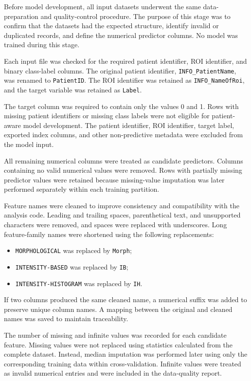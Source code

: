 \documentclass[12pt,twocolumn]{article}
\begin{document}
Before model development, all input datasets underwent the same
data-preparation and quality-control procedure. The purpose of this
stage was to confirm that the datasets had the expected structure,
identify invalid or duplicated records, and define the numerical
predictor columns. No model was trained during this stage.

Each input file was checked for the required patient identifier, ROI
identifier, and binary class-label columns. The original patient
identifier, \texttt{INFO\_PatientName}, was renamed to
\texttt{PatientID}. The ROI identifier was retained as
\texttt{INFO\_NameOfRoi}, and the target variable was retained as
\texttt{Label}.

The target column was required to contain only the values 0 and 1.
Rows with missing patient identifiers or missing class labels were not
eligible for patient-aware model development. The patient identifier,
ROI identifier, target label, exported index columns, and other
non-predictive metadata were excluded from the model input.

All remaining numerical columns were treated as candidate predictors.
Columns containing no valid numerical values were removed. Rows with
partially missing predictor values were retained because missing-value
imputation was later performed separately within each training
partition.

Feature names were cleaned to improve consistency and compatibility
with the analysis code. Leading and trailing spaces, parenthetical
text, and unsupported characters were removed, and spaces were
replaced with underscores. Long feature-family names were shortened
using the following replacements:

\begin{itemize}
    \item \texttt{MORPHOLOGICAL} was replaced by \texttt{Morph};
    \item \texttt{INTENSITY-BASED} was replaced by \texttt{IB};
    \item \texttt{INTENSITY-HISTOGRAM} was replaced by \texttt{IH}.
\end{itemize}

If two columns produced the same cleaned name, a numerical suffix was
added to preserve unique column names. A mapping between the original
and cleaned names was saved to maintain traceability.

The number of missing and infinite values was recorded for each
candidate feature. Missing values were not replaced using statistics
calculated from the complete dataset. Instead, median imputation was
performed later using only the corresponding training data within
cross-validation. Infinite values were treated as invalid numerical
entries and were included in the data-quality report.
\end{document}
